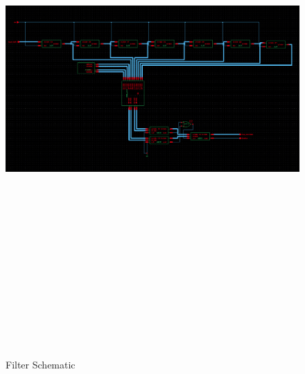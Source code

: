\begin{figure}[htbp]
\centering
\includegraphics[angle=90,height=8in]{images/Filter-Schematic}
\caption{Filter Schematic}
\label{fig:filterschematic}
\end{figure}


